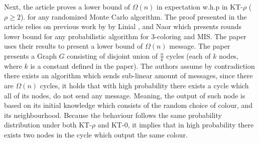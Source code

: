 \documentclass[11pt]{article}
\begin{document}
Next, the article proves a lower bound of $\Omega(n)$ in expectation w.h.p in KT-$\rho$ ($\rho \ge 2$). for any randomized Monte Carlo algorithm.
The proof presented in the article relies on previous work by by Linial \cite{Linial}, and Naor \cite{Naor} which presents rounds lower bound for any probabilistic algorithm for 3-coloring and MIS. The paper uses their results to present a lower bound of $\Omega(n)$ message. The paper presents a Graph $G$ consisting of disjoint union of $\frac{n}{k}$ cycles (each of $k$ nodes, where $k$ is a constant defined in the paper). The authors assume by contradiction there exists an algorithm which sends sub-linear amount of messages, since there are  $\Omega(n)$ cycles, it holds that with high probability there exists a cycle which all of its nodes, do not send any message. Meaning, the output of such node is based on its initial knowledge which consists of the random choice of colour, and its neighbourhood. Because the behaviour follows the same probability distribution under both KT-$\rho$ and KT-$0$, it implies that in high probability there exists two nodes in the cycle which output the same colour.
\end{document}

